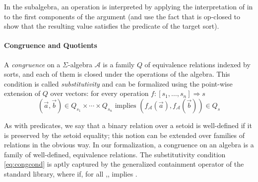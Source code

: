 \noindent In the subalgebra, an operation  is interpreted by
applying the interpretation of  in  to the first components of
the argument (and use the fact that  is op-closed to show that
the resulting value satisfies the predicate of the target sort).

\paragraph*{Congruence and Quotients}
A \emph{congruence} on a $\Sigma$-algebra
$\mathcal{A}$ is a family
$Q$ of equivalence relations indexed by sorts, and each of them is
closed under the operations of the algebra. This condition is called
\emph{substitutivity} and can be formalized using the point-wise
extension of $Q$ over vectors: for every operation $ f : [s_1,
\ldots,s_n] \Rightarrow s$
\begin{equation}
  (\vec{a},\vec{b}) \in Q_{s_1} \times \cdots \times Q_{s_n} \text{ implies }
 (f_{\mathcal{A}}(\vec{a}) , f_{\mathcal{A}}(\vec{b})) \in Q_s\label{eq:congcond}
\end{equation} 

As with predicates, we say that a binary relation over a setoid is
well-defined if it is preserved by the setoid equality; this notion
can be extended over families of relations in the obvious way. In our
formalization, a congruence on an algebra  is a family  of
well-defined, equivalence relations. The substitutivity condition
\eqref{eq:congcond} is aptly captured by the generalized containment
operator \AgdaUnderscore{}\AgdaOperator{\AgdaFunction{=[}}\AgdaUnderscore{}%
\AgdaOperator{\AgdaFunction{]⇒}}\AgdaUnderscore{} of the standard library, where \AgdaSpace{}\AgdaOperator{\AgdaFunction{=[}}\AgdaSpace{}%
\AgdaSpace{}\AgdaOperator{\AgdaFunction{]⇒}}\AgdaSpace{} if,
for all ,\AgdaSpace{}\AgdaSpace{}, \AgdaSymbol{(}\AgdaInductiveConstructor{,}\AgdaSymbol{)}\AgdaSpace{}\AgdaSpace{} implies \AgdaSymbol{(}\AgdaSpace{}\AgdaInductiveConstructor{,}\AgdaSpace{}\AgdaSpace{}\AgdaSymbol{)}\AgdaSpace{}\AgdaSpace{}.


